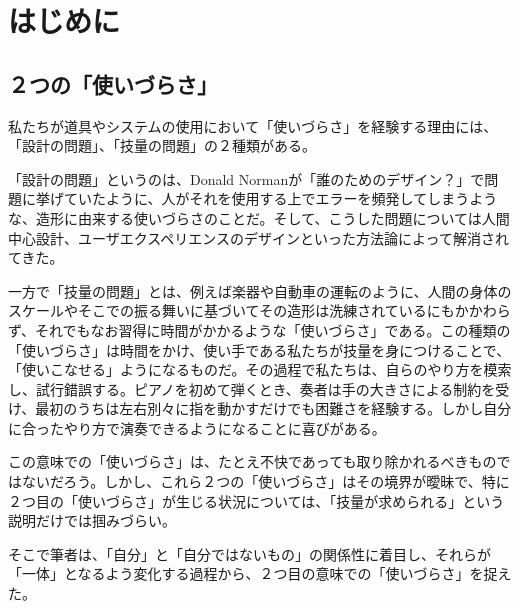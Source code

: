 \chapter{はじめに}
\label{introduction}

\section*{２つの「使いづらさ」}
私たちが道具やシステムの使用において「使いづらさ」を経験する理由には、「設計の問題」、「技量の問題」の２種類がある。

「設計の問題」というのは、Donald Normanが「誰のためのデザイン？」で問題に挙げていたように、人がそれを使用する上でエラーを頻発してしまうような、造形に由来する使いづらさのことだ。そして、こうした問題については人間中心設計、ユーザエクスペリエンスのデザインといった方法論によって解消されてきた。

一方で「技量の問題」とは、例えば楽器や自動車の運転のように、人間の身体のスケールやそこでの振る舞いに基づいてその造形は洗練されているにもかかわらず、それでもなお習得に時間がかかるような「使いづらさ」である。この種類の「使いづらさ」は時間をかけ、使い手である私たちが技量を身につけることで、「使いこなせる」ようになるものだ。その過程で私たちは、自らのやり方を模索し、試行錯誤する。ピアノを初めて弾くとき、奏者は手の大きさによる制約を受け、最初のうちは左右別々に指を動かすだけでも困難さを経験する。しかし自分に合ったやり方で演奏できるようになることに喜びがある。

この意味での「使いづらさ」は、たとえ不快であっても取り除かれるべきものではないだろう。しかし、これら２つの「使いづらさ」はその境界が曖昧で、特に２つ目の「使いづらさ」が生じる状況については、「技量が求められる」という説明だけでは掴みづらい。

そこで筆者は、「自分」と「自分ではないもの」の関係性に着目し、それらが「一体」となるよう変化する過程から、２つ目の意味での「使いづらさ」を捉えた。

